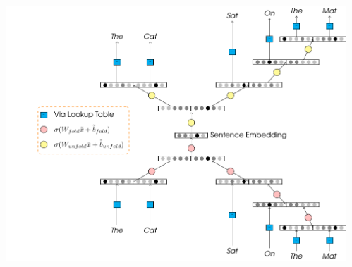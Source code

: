 \documentclass[a0papper, landscape]{tikzposter}
\begin{document}
\begin{columns}
{{\begin{minipage}[t]{0.48\linewidth}
\begin{tikzfigure}
				\end{tikzfigure}				
			\end{minipage}%
			\hfill
			\begin{adjustbox}{valign=t}
				\begin{minipage}[t]{0.48\linewidth}
					\small{}
				\end{minipage}
			\end{adjustbox}
		}
		\vspace{2ex}
		{
			\begin{minipage}[t]{0.48\linewidth}
				\begin{tikzfigure}
					\includegraphics[width=\textwidth]{URAE}
				\end{tikzfigure}				
			\end{minipage}%
			\hfill
			\begin{adjustbox}{valign=t}
				\begin{minipage}[t]{0.48\linewidth}
					\small{}
				\end{minipage}
			\end{adjustbox}
		}
	 		
	}
    

\end{columns}
\end{document}
